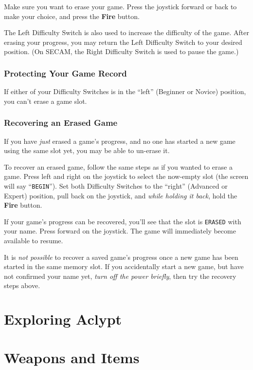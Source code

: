 \documentclass[10pt,twocolumn,openany,article]{memoir}
\begin{document}
Make sure  you want to  erase your game.  Press the joystick  forward or
back to make your choice, and press the \textbf{Fire} button.

The Left  Difficulty Switch is also  used to increase the  difficulty of
the  game.  After  erasing  your  progress,  you  may  return  the  Left
Difficulty  Switch  to  your  desired position.  (On  SECAM,  the  Right
Difficulty Switch is used to pause the game.)

\subsection{Protecting Your Game Record}

If either  of your Difficulty Switches  is in the ``left''  (Beginner or
Novice) position, you can't erase a game slot.

\subsection{Recovering an Erased Game}

If you have \emph{just} erased a game's progress, and no one has started
a new game using the same slot yet, you may be able to un-erase it.

To recover  an erased game,  follow the same steps  as if you  wanted to
erase  a game.  Press  left and  right  on the  joystick  to select  the
now-empty  slot  (the  screen  will say  ``\texttt{BEGIN}'').  Set  both
Difficulty Switches to the ``right'' (Advanced or Expert) position, pull
back  on  the joystick,  and  \emph{while  holding  it back},  hold  the
\textbf{Fire} button.

If your  game's progress can be  recovered, you'll see that  the slot is
\texttt{ERASED} with your name. Press  forward on the joystick. The game
will immediately become available to resume.

It is \emph{not possible} to recover  a saved game's progress once a new
game has been started in the same memory slot. If you accidentally start
a new  game, but have  not confirmed your  name yet, \emph{turn  off the
  power briefly}, then try the recovery steps above.

\chapter{Exploring Aclypt}

\chapter{Weapons and Items}
\end{document}
